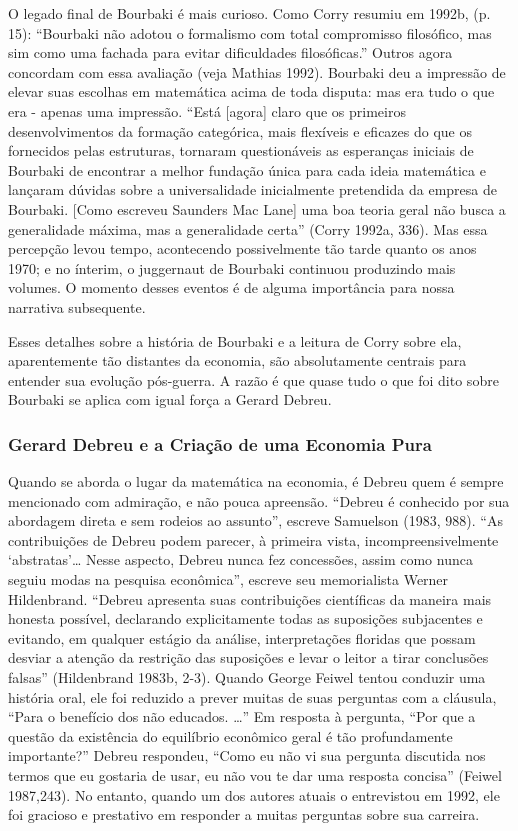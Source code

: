 \documentclass[12pt]{article}
\begin{document}
O legado final de Bourbaki é mais curioso. Como Corry resumiu em 1992b, (p. 15): “Bourbaki não adotou o formalismo com total compromisso filosófico, mas sim como uma fachada para evitar dificuldades filosóficas.” Outros agora concordam com essa avaliação (veja Mathias 1992). Bourbaki deu a impressão de elevar suas escolhas em matemática acima de toda disputa: mas era tudo o que era - apenas uma impressão. “Está [agora] claro que os primeiros desenvolvimentos da formação categórica, mais flexíveis e eficazes do que os fornecidos pelas estruturas, tornaram questionáveis as esperanças iniciais de Bourbaki de encontrar a melhor fundação única para cada ideia matemática e lançaram dúvidas sobre a universalidade inicialmente pretendida da empresa de Bourbaki. [Como escreveu Saunders Mac Lane] uma boa teoria geral não busca a generalidade máxima, mas a generalidade certa” (Corry 1992a, 336). Mas essa percepção levou tempo, acontecendo possivelmente tão tarde quanto os anos 1970; e no ínterim, o juggernaut de Bourbaki continuou produzindo mais volumes. O momento desses eventos é de alguma importância para nossa narrativa subsequente.

Esses detalhes sobre a história de Bourbaki e a leitura de Corry sobre ela, aparentemente tão distantes da economia, são absolutamente centrais para entender sua evolução pós-guerra. A razão é que quase tudo o que foi dito sobre Bourbaki se aplica com igual força a Gerard Debreu.

\subsubsection{\textbf{Gerard Debreu e a Criação de uma Economia Pura}}
Quando se aborda o lugar da matemática na economia, é Debreu quem é sempre mencionado com admiração, e não pouca apreensão. “Debreu é conhecido por sua abordagem direta e sem rodeios ao assunto”, escreve Samuelson (1983, 988). “As contribuições de Debreu podem parecer, à primeira vista, incompreensivelmente ‘abstratas’… Nesse aspecto, Debreu nunca fez concessões, assim como nunca seguiu modas na pesquisa econômica”, escreve seu memorialista Werner Hildenbrand. “Debreu apresenta suas contribuições científicas da maneira mais honesta possível, declarando explicitamente todas as suposições subjacentes e evitando, em qualquer estágio da análise, interpretações floridas que possam desviar a atenção da restrição das suposições e levar o leitor a tirar conclusões falsas” (Hildenbrand 1983b, 2-3). Quando George Feiwel tentou conduzir uma história oral, ele foi reduzido a prever muitas de suas perguntas com a cláusula, “Para o benefício dos não educados. …” Em resposta à pergunta, “Por que a questão da existência do equilíbrio econômico geral é tão profundamente importante?” Debreu respondeu, “Como eu não vi sua pergunta discutida nos termos que eu gostaria de usar, eu não vou te dar uma resposta concisa” (Feiwel 1987,243). No entanto, quando um dos autores atuais o entrevistou em 1992, ele foi gracioso e prestativo em responder a muitas perguntas sobre sua carreira.
\end{document}
